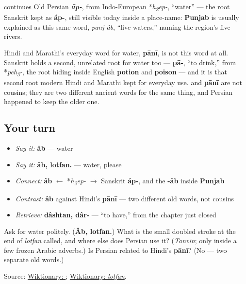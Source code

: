 \begin{cousinweb}
\textbf{} continues Old Persian \emph{\textbf{āp-}}, from Indo-European *\emph{h\textsubscript{2}ep-}, “water” — the root Sanskrit kept as \textbf{áp-}, still visible today inside a place-name: \textbf{Punjab} is usually explained as this same word, \emph{panj âb}, “five waters,” naming the region's five rivers.

Hindi and Marathi's everyday word for water, \textbf{pānī}, is not this word at all. Sanskrit holds a second, unrelated root for water too — \textbf{pā-}, “to drink,” from *\emph{peh\textsubscript{3}-}, the root hiding inside English \textbf{potion} and \textbf{poison} — and it is that second root modern Hindi and Marathi kept for everyday use. \textbf{} and \textbf{pānī} are not cousins; they are two different ancient words for the same thing, and Persian happened to keep the older one.
\end{cousinweb}

\subsection*{Your turn}
\begin{itemize}
\raggedright
  \item \emph{Say it:} \textbf{âb} — water
  \item \emph{Say it:} \textbf{âb, lotfan.} — water, please
  \item \emph{Connect:} \textbf{âb} $\leftarrow$ *\emph{h\textsubscript{2}ep-} $\to$ Sanskrit \textbf{áp-}, and the \textbf{-âb} inside \textbf{Punjab}
  \item \emph{Contrast:} \textbf{âb} against Hindi's \textbf{pānī} — two different old words, not cousins
  \item \emph{Retrieve:} \textbf{dâshtan, dâr-} — “to have,” from the chapter just closed
\end{itemize}

\begin{tcolorbox}[breakable,colback=teal!4,colframe=teal!35!black,title={Before you move on}]
Ask for water politely. (\textbf{Âb, lotfan.}) What is the small doubled stroke at the end of \emph{lotfan} called, and where else does Persian use it? (\emph{Tanvin}; only inside a few frozen Arabic adverbs.) Is Persian \textbf{} related to Hindi's \textbf{pānī}? (No — two separate old words.)

Source: \href{https://en.wiktionary.org/wiki/\%D8\%A2\%D8\%A8}{Wiktionary: }; \href{https://en.wiktionary.org/wiki/\%D9\%84\%D8\%B7\%D9\%81\%D8\%A7\%D9\%8B}{Wiktionary: \emph{lotfan}}.
\end{tcolorbox}
